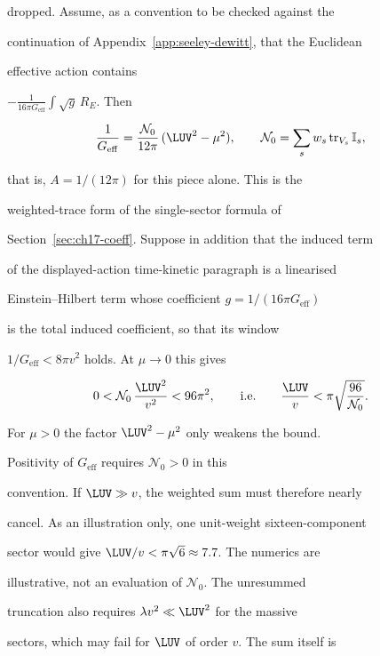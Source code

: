 dropped. Assume, as a convention to be checked against the

continuation of Appendix~\ref{app:seeley-dewitt}, that the Euclidean

effective action contains

\(-\tfrac{1}{16\pi G_{\mathrm{eff}}}\int\sqrt g\,R_E\). Then

\[

  \frac1{G_{\mathrm{eff}}}

  =\frac{\mathcal N_0}{12\pi}\,(\LUV^2-\mu^2),

  \qquad

  \mathcal N_0=\sum_{s}w_s\operatorname{tr}_{V_s}\mathbb I_s ,

\]

that is, \(A=1/(12\pi)\) for this piece alone. This is the

weighted-trace form of the single-sector formula of

Section~\ref{sec:ch17-coeff}. Suppose in addition that the induced term

of the displayed-action time-kinetic paragraph is a linearised

Einstein--Hilbert term whose coefficient \(g=1/(16\pi G_{\mathrm{eff}})\)

is the total induced coefficient, so that its window

\(1/G_{\mathrm{eff}}<8\pi v^2\) holds. At \(\mu\to0\) this gives

\[

  0<\mathcal N_0\,\frac{\LUV^2}{v^2}<96\pi^2,

  \qquad\text{i.e.}\qquad

  \frac{\LUV}{v}<\pi\sqrt{\frac{96}{\mathcal N_0}} .

\]

For \(\mu>0\) the factor \(\LUV^2-\mu^2\) only weakens the bound.

Positivity of \(G_{\mathrm{eff}}\) requires \(\mathcal N_0>0\) in this

convention. If \(\LUV\gg v\), the weighted sum must therefore nearly

cancel. As an illustration only, one unit-weight sixteen-component

sector would give \(\LUV/v<\pi\sqrt6\approx7.7\). The numerics are

illustrative, not an evaluation of \(\mathcal N_0\). The unresummed

truncation also requires \(\lambda v^2\ll\LUV^2\) for the massive

sectors, which may fail for \(\LUV\) of order \(v\). The sum itself is

